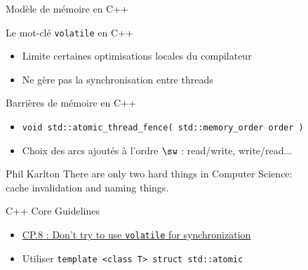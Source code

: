 
\begingroup

\begin{frame}[fragile]{Modèle de mémoire en C++}

  \vfill

  \begin{block}{Le mot-clé \lstinline{volatile} en C++}
    \begin{itemize}
    \item Limite certaines optimisations locales du compilateur
    \item \alert{Ne gère pas la synchronisation entre threads}
    \end{itemize}
  \end{block}

  \vfill

  \begin{block}{Barrières de mémoire en C++}
    \begin{itemize}
    \item \lstinline{void std::atomic_thread_fence( std::memory_order order )}
    \item Choix des arcs ajoutés à l'ordre $\sw$ : read/write, write/read...
    \end{itemize}
    \vspace{1mm}
    \begin{shadequote}{Phil Karlton}
      There are only two hard things in Computer Science: \\cache invalidation and naming things.
    \end{shadequote}
  \end{block}

  \vspace{-3mm}
  
  \begin{alertblock}{C++ Core Guidelines}
    \begin{itemize}
    \item \href{https://isocpp.github.io/CppCoreGuidelines/CppCoreGuidelines#Rconc-volatile}{\alert{CP.8 :} Don’t try to use \lstinline{volatile} for synchronization}
    \item Utiliser \lstinline{template <class T> struct std::atomic}
    \end{itemize}
  \end{alertblock}

  \vspace{-1mm}

  
\end{frame}

\endgroup
\endinput
